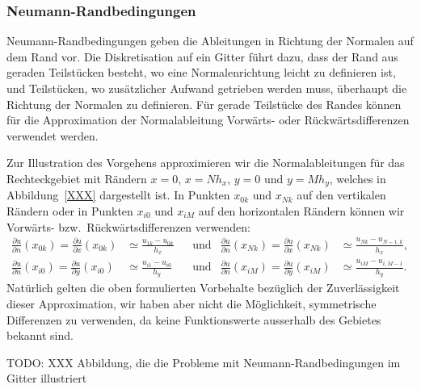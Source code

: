 \subsubsection{Neumann-Randbedingungen}
Neumann-Randbedingungen geben die Ableitungen in Richtung der Normalen
auf dem Rand vor.
Die Diskretisation auf ein Gitter führt dazu, dass der Rand aus geraden
Teilstücken besteht, wo eine Normalenrichtung leicht zu definieren ist,
und Teilstücken, wo zusätzlicher Aufwand getrieben werden muss, überhaupt
die Richtung der Normalen zu definieren.
Für gerade Teilstücke des Randes können für die Approximation der
Normalableitung Vorwärts- oder Rückwärtsdifferenzen verwendet
werden.

\begin{beispiel}
Zur Illustration des Vorgehens approximieren wir die Normalableitungen
für das Rechteckgebiet mit Rändern $x=0$, $x=Nh_x$, $y=0$ und $y=Mh_y$,
welches in Abbildung~\ref{XXX} dargestellt ist.
In Punkten $x_{0k}$ und $x_{Nk}$ auf den vertikalen Rändern
oder in Punkten $x_{i0}$ und $x_{iM}$ auf den horizontalen Rändern
können wir Vorwärts- bzw.~Rückwärtsdifferenzen verwenden:
\begin{align*}
\frac{\partial u}{\partial n}(x_{0k})
=
\frac{\partial u}{\partial x}(x_{0k})
&\simeq
\frac{u_{1k}-u_{0k}}{h_x}
&&\text{und}&
\frac{\partial u}{\partial n}(x_{Nk})
=
\frac{\partial u}{\partial x}(x_{Nk})
&\simeq
\frac{u_{Nk}-u_{N-1,k}}{h_x},
\\
\frac{\partial u}{\partial n}(x_{i0})
=
\frac{\partial u}{\partial y}(x_{i0})
&\simeq
\frac{u_{i1}-u_{i0}}{h_y}
&&\text{und}&
\frac{\partial u}{\partial n}(x_{iM})
=
\frac{\partial u}{\partial y}(x_{iM})
&\simeq
\frac{u_{iM}-u_{i,M-1}}{h_y}.
\end{align*}
Natürlich gelten die oben formulierten Vorbehalte bezüglich der
Zuverlässigkeit dieser Approximation, wir haben aber nicht die Möglichkeit,
symmetrische Differenzen zu verwenden, da keine Funktionswerte ausserhalb
des Gebietes bekannt sind.
\end{beispiel}

TODO: XXX Abbildung, die die Probleme mit Neumann-Randbedingungen im
Gitter illustriert

